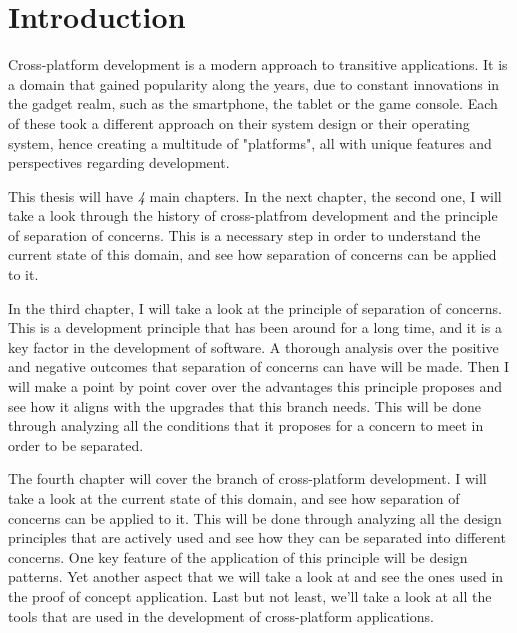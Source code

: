 \chapter{Introduction}

\label{intro}


Cross-platform development is a modern approach to transitive applications.
It is a domain that gained popularity along the years, due to constant innovations in the gadget realm, such as the smartphone, the tablet or the game console.
Each of these took a different approach on their system design or their operating system, hence creating a multitude of "platforms", all with unique features and perspectives regarding development.

\par
This thesis will have \textit{4} main chapters.
In the next chapter, the second one, I will take a look through the history of cross-platfrom development and the principle of separation of concerns.
This is a necessary step in order to understand the current state of this domain, and see how separation of concerns can be applied to it.

\par
In the third chapter, I will take a look at the principle of separation of concerns.
This is a development principle that has been around for a long time, and it is a key factor in the development of software.
A thorough analysis over the positive and negative outcomes that separation of concerns can have will be made.
Then I will make a point by point cover over the advantages this principle proposes and see how it aligns with the upgrades that this branch needs.
This will be done through analyzing all the conditions that it proposes for a concern to meet in order to be separated.


\par
The fourth chapter will cover the branch of cross-platform development.
I will take a look at the current state of this domain, and see how separation of concerns can be applied to it.
This will be done through analyzing all the design principles that are actively used and see how they can be separated into different concerns.
One key feature of the application of this principle will be design patterns.
Yet another aspect that we will take a look at and see the ones used in the proof of concept application.
Last but not least, we'll take a look at all the tools that are used in the development of cross-platform applications.

